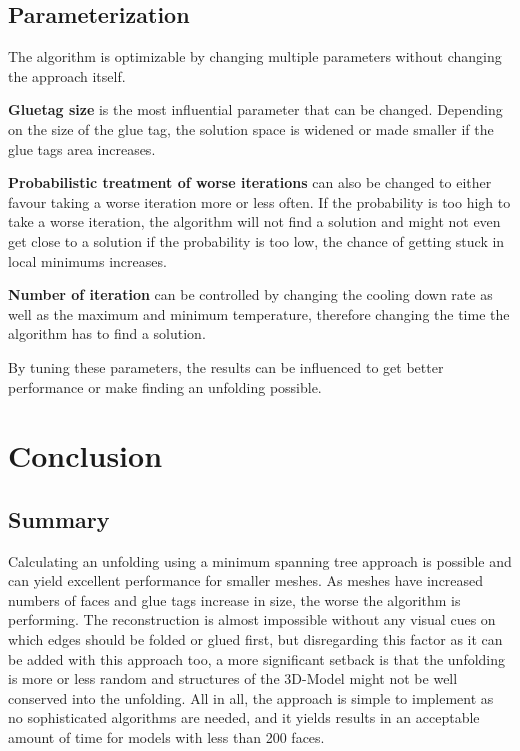 \documentclass[draft,final]{vutinfth} %
\begin{document}
\section{Parameterization}

The algorithm is optimizable by changing multiple parameters without changing the approach itself.

\textbf{Gluetag size} is the most influential parameter that can be changed. Depending on the size of the glue tag, the solution space is widened or made smaller if the glue tags area increases.

\textbf{Probabilistic treatment of worse iterations} can also be changed to either favour taking a worse iteration more or less often. If the probability is too high to take a worse iteration, the algorithm will not find a solution and might not even get close to a solution if the probability is too low, the chance of getting stuck in local minimums increases.

\textbf{Number of iteration} can be controlled by changing the cooling down rate as well as the maximum and minimum temperature, therefore changing the time the algorithm has to find a solution.

By tuning these parameters, the results can be influenced to get better performance or make finding an unfolding possible.

\chapter{Conclusion}
\label{chap:conclusion}

\section{Summary}
Calculating an unfolding using a minimum spanning tree approach is possible and can yield excellent performance for smaller meshes. As meshes have increased numbers of faces and glue tags increase in size, the worse the algorithm is performing. The reconstruction is almost impossible without any visual cues on which edges should be folded or glued first, but disregarding this factor as it can be added with this approach too, a more significant setback is that the unfolding is more or less random and structures of the 3D-Model might not be well conserved into the unfolding. All in all, the approach is simple to implement as no sophisticated algorithms are needed, and it yields results in an acceptable amount of time for models with less than 200 faces.
\end{document}
